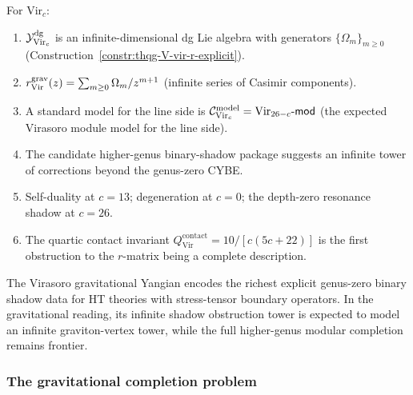 \begin{computation}
For $\mathrm{Vir}_c$:
\begin{enumerate}[label=\textup{(\roman*)}]
\item $\mathcal{Y}^{\mathrm{dg}}_{\mathrm{Vir}_c}$ is an infinite-dimensional
 dg Lie algebra with generators $\{\Omega_m\}_{m \geq 0}$
 (Construction~\ref{constr:thqg-V-vir-r-explicit}).
\item $r^{\mathrm{grav}}_{\mathrm{Vir}}(z) =
 \sum_{m \geq 0} \Omega_m/z^{m+1}$ (infinite series of
 Casimir components).
\item A standard model for the line side is
 $\mathcal{C}_{\mathrm{Vir}_c}^{\mathrm{model}} =
 \mathrm{Vir}_{26-c}\text{-}\mathsf{mod}$
 (the expected Virasoro module model for the line side).
\item The candidate higher-genus binary-shadow package suggests an
 infinite tower of corrections beyond the genus-zero CYBE.
\item Self-duality at $c = 13$; degeneration at $c = 0$;
 the depth-zero resonance shadow at $c = 26$.
\item The quartic contact invariant
 $Q^{\mathrm{contact}}_{\mathrm{Vir}} = 10/[c(5c+22)]$
 is the first obstruction to the $r$-matrix being a
 complete description.
\end{enumerate}
The Virasoro gravitational Yangian encodes the richest explicit
genus-zero binary shadow data for HT theories with stress-tensor
boundary operators. In the gravitational reading, its infinite
shadow obstruction tower is expected to model an infinite graviton-vertex tower,
while the full higher-genus modular completion remains frontier.
\end{computation}


\subsubsection{The gravitational completion problem}

